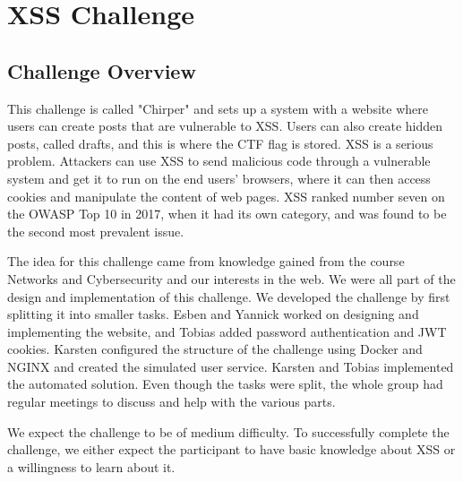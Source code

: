 \section{XSS Challenge}\label{sec:xss-challenge}

\subsection{Challenge Overview}

This challenge is called "Chirper" and sets up a system with a website where users can create posts that are vulnerable to XSS. Users can also create hidden posts, called drafts, and this is where the CTF flag is stored. XSS is a serious problem. Attackers can use XSS to send malicious code through a vulnerable system and get it to run on the end users' browsers, where it can then access cookies and manipulate the content of web pages\cite[pp. 507-508]{Stallings_Brown_2017}. XSS ranked number seven on the OWASP Top 10 in 2017, when it had its own category, and was found to be the second most prevalent issue\cite{owasp__xss_top_ten}.

The idea for this challenge came from knowledge gained from the course Networks and Cybersecurity\cite{sdu_dm586} and our interests in the web. We were all part of the design and implementation of this challenge. We developed the challenge by first splitting it into smaller tasks. Esben and Yannick worked on designing and implementing the website, and Tobias added password authentication and JWT\cite{rfc7519} cookies. Karsten configured the structure of the challenge using Docker and NGINX and created the simulated user service. Karsten and Tobias implemented the automated solution. Even though the tasks were split, the whole group had regular meetings to discuss and help with the various parts.

We expect the challenge to be of medium difficulty. To successfully complete the challenge, we either expect the participant to have basic knowledge about XSS or a willingness to learn about it.



